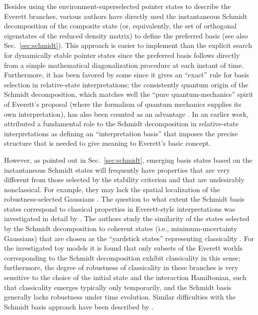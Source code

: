\documentclass[rmp,aps,amsmath,amsfonts,noshowkeys,noshowpacs,12pt]{revtex4}
\begin{document}
Besides using the environment-superselected pointer states to describe
the Everett branches, various authors have directly used the
instantaneous Schmidt decomposition of the composite state (or,
equivalently, the set of orthogonal eigenstates of the reduced density
matrix) to define the preferred basis (see also
Sec.~\ref{sec:schmidt}). This approach is easier to implement than the
explicit search for dynamically stable pointer states since the
preferred basis follows directly from a simple mathematical
diagonalization procedure at each instant of time. Furthermore, it has
been favored by some \citep[e.g.,][]{Zeh:1973:wq} since it gives an
``exact'' rule for basis selection in relative-state interpretations;
the consistently quantum origin of the Schmidt decomposition, which
matches well the ``pure quantum-mechanics'' spirit of Everett's
proposal (where the formalism of quantum mechanics supplies its own
interpretation), has also been counted as an advantage
\citep{Barvinsky:1995:pa}. In an earlier work, \citet{Deutsch:1985:rx}
attributed a fundamental role to the Schmidt decomposition in
relative-state interpretations as defining an ``interpretation basis''
that imposes the precise structure that is needed to give meaning to
Everett's basic concept.

However, as pointed out in Sec.~\ref{sec:schmidt}, emerging basis
states based on the instantaneous Schmidt states will frequently have
properties that are very different from those selected by the
stability criterion and that are undesirably nonclassical. For
example, they may lack the spatial localization of the
robustness-selected Gaussians \citep{Stapp:2002:pc}. The question to
what extent the Schmidt basis states correspond to classical
properties in Everett-style interpretations was investigated in detail
by \citet{Barvinsky:1995:pa}. The authors study the similarity of the
states selected by the Schmidt decomposition to coherent states (i.e.,
minimum-uncertainty Gaussians) that are chosen as the ``yardstick
states'' representing classicality \citep[see also][]{Eisert:2003:ib}.
For the investigated toy models it is found that only subsets of the
Everett worlds corresponding to the Schmidt decomposition exhibit
classicality in this sense; furthermore, the degree of robustness of
classicality in these branches is very sensitive to the choice of the
initial state and the interaction Hamiltonian, such that classicality
emerges typically only temporarily, and the Schmidt basis generally
lacks robustness under time evolution.  Similar difficulties with the
Schmidt basis approach have been described by \citet{Kent:1997:oz}.
\end{document}
